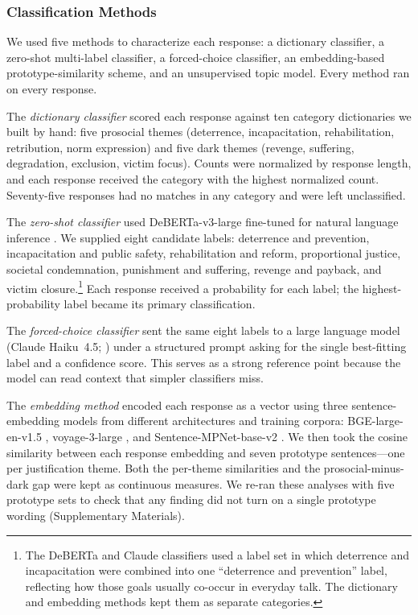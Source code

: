 \subsubsection{Classification Methods}

We used five methods to characterize each response: a dictionary classifier, a zero-shot multi-label classifier, a forced-choice classifier, an embedding-based prototype-similarity scheme, and an unsupervised topic model. Every method ran on every response.

The \textit{dictionary classifier} scored each response against ten category dictionaries we built by hand: five prosocial themes (deterrence, incapacitation, rehabilitation, retribution, norm expression) and five dark themes (revenge, suffering, degradation, exclusion, victim focus). Counts were normalized by response length, and each response received the category with the highest normalized count. Seventy-five responses had no matches in any category and were left unclassified.

The \textit{zero-shot classifier} used DeBERTa-v3-large fine-tuned for natural language inference \citep{he2023deberta}. We supplied eight candidate labels: deterrence and prevention, incapacitation and public safety, rehabilitation and reform, proportional justice, societal condemnation, punishment and suffering, revenge and payback, and victim closure.\footnote{The DeBERTa and Claude classifiers used a label set in which deterrence and incapacitation were combined into one ``deterrence and prevention'' label, reflecting how those goals usually co-occur in everyday talk. The dictionary and embedding methods kept them as separate categories.} Each response received a probability for each label; the highest-probability label became its primary classification.

The \textit{forced-choice classifier} sent the same eight labels to a large language model (Claude Haiku~4.5; \citealp{anthropicclaude2024}) under a structured prompt asking for the single best-fitting label and a confidence score. This serves as a strong reference point because the model can read context that simpler classifiers miss.

The \textit{embedding method} encoded each response as a vector using three sentence-embedding models from different architectures and training corpora: BGE-large-en-v1.5 \citep{xiao2024bge}, voyage-3-large \citep{voyageai2024}, and Sentence-MPNet-base-v2 \citep{song2020mpnet, reimers2019sentence}. We then took the cosine similarity between each response embedding and seven prototype sentences---one per justification theme. Both the per-theme similarities and the prosocial-minus-dark gap were kept as continuous measures. We re-ran these analyses with five prototype sets to check that any finding did not turn on a single prototype wording (Supplementary Materials).

